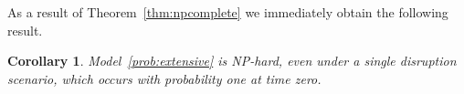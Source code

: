 \documentclass[11pt]{article}
\newtheorem{corollary}[theorem]{Corollary}
\begin{document}
	As a result of Theorem~\ref{thm:npcomplete} we immediately obtain the following result.
	\begin{corollary} \label{thm:nphard}
		Model~\eqref{prob:extensive} is NP-hard, even under a single disruption scenario, which occurs with probability one at time zero.
	\end{corollary}
	
\end{document}
